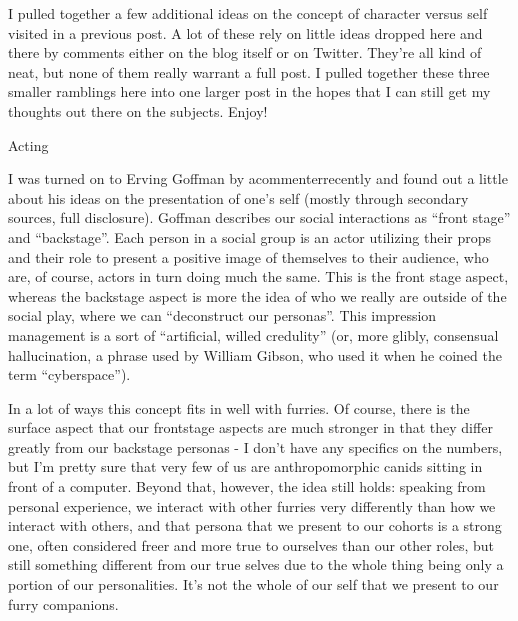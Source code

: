 
I pulled together a few additional ideas on the concept of character versus self visited in a previous post. A lot of these rely on little ideas dropped here and there by comments either on the blog itself or on Twitter. They're all kind of neat, but none of them really warrant a full post. I pulled together these three smaller ramblings here into one larger post in the hopes that I can still get my thoughts out there on the subjects. Enjoy!

Acting

I was turned on to Erving Goffman by acommenterrecently and found out a little about his ideas on the presentation of one's self (mostly through secondary sources, full disclosure). Goffman describes our social interactions as ``front stage'' and ``backstage''. Each person in a social group is an actor utilizing their props and their role to present a positive image of themselves to their audience, who are, of course, actors in turn doing much the same. This is the front stage aspect, whereas the backstage aspect is more the idea of who we really are outside of the social play, where we can ``deconstruct our personas''. This impression management is a sort of ``artificial, willed credulity'' (or, more glibly, consensual hallucination, a phrase used by William Gibson, who used it when he coined the term ``cyberspace'').

In a lot of ways this concept fits in well with furries. Of course, there is the surface aspect that our frontstage aspects are much stronger in that they differ greatly from our backstage personas - I don't have any specifics on the numbers, but I'm pretty sure that very few of us are anthropomorphic canids sitting in front of a computer. Beyond that, however, the idea still holds: speaking from personal experience, we interact with other furries very differently than how we interact with others, and that persona that we present to our cohorts is a strong one, often considered freer and more true to ourselves than our other roles, but still something different from our true selves due to the whole thing being only a portion of our personalities. It's not the whole of our self that we present to our furry companions.

